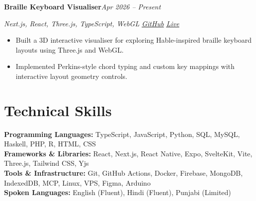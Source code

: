 \documentclass[10pt,a4paper]{article}
\let\oldhref\href
\renewcommand{\href}[2]{\oldhref{#1}{\underline{#2}}}
\newcommand{\resumeProject}[3]{%
  \noindent\textbf{#1}\hfill\textit{#2}\par
  \noindent\textit{\color{muted}#3}\par
}
\newcommand{\skillsep}{\\[3pt]}
\begin{document}
\resumeProject{Braille Keyboard Visualiser}{Apr 2026 -- Present}{Next.js, React, Three.js, TypeScript, WebGL \textbar{} \href{https://github.com/pjrus/braille-keyboard-visualizer}{GitHub} \textbar{} \href{https://pjrus.github.io/braille-keyboard-visualizer/}{Live}}
\begin{itemize}
  \item Built a 3D interactive visualiser for exploring Hable-inspired braille keyboard layouts using Three.js and WebGL.
  \item Implemented Perkins-style chord typing and custom key mappings with interactive layout geometry controls.
\end{itemize}

\section{Technical Skills}
\textbf{Programming Languages:} TypeScript, JavaScript, Python, SQL, MySQL, Haskell, PHP, R, HTML, CSS\skillsep
\textbf{Frameworks \& Libraries:} React, Next.js, React Native, Expo, SvelteKit, Vite, Three.js, Tailwind CSS, Yjs\skillsep
\textbf{Tools \& Infrastructure:} Git, GitHub Actions, Docker, Firebase, MongoDB, IndexedDB, MCP, Linux, VPS, Figma, Arduino\skillsep
\textbf{Spoken Languages:} English (Fluent), Hindi (Fluent), Punjabi (Limited)
\end{document}
